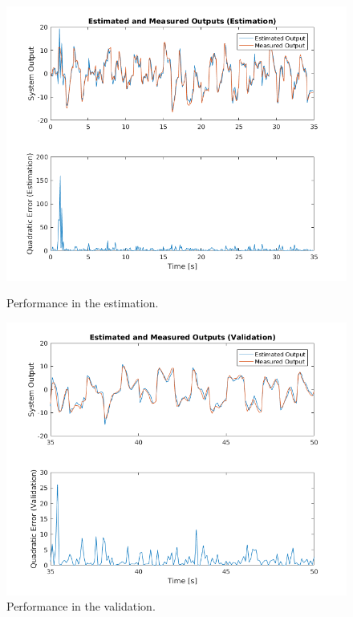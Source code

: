 \documentclass[11pt]{article}
\begin{document}
\begin{figure}[H]
	\centering
	\begin{minipage}{.5\textwidth}
		\centering
		\includegraphics[keepaspectratio=true, scale=0.35]{images/arx1_performance_estimation.png}
		\caption{Performance in the estimation.}
		\label{arx1_performance_estimation}
	\end{minipage}%
	\begin{minipage}{.5\textwidth}
		\centering
		\includegraphics[keepaspectratio=true, scale=0.35]{images/arx1_performance_validation.png}
		\caption{Performance in the validation.}
		\label{arx1_performance_validation}
	\end{minipage}
\end{figure}
\end{document}
